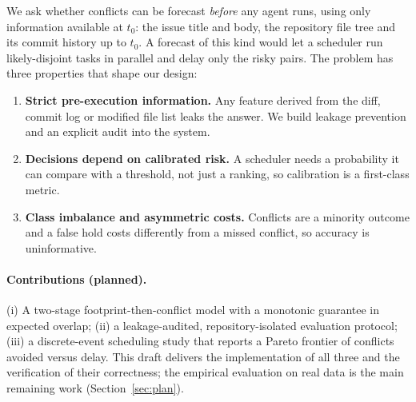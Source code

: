 \documentclass[sigconf, authorversion, nonacm]{acmart}
\begin{document}
We ask whether conflicts can be forecast \emph{before} any agent runs, using only information available at $t_0$: the issue title and body, the repository file tree and its commit history up to $t_0$. A forecast of this kind would let a scheduler run likely-disjoint tasks in parallel and delay only the risky pairs. The problem has three properties that shape our design:
\begin{enumerate}
  \item \textbf{Strict pre-execution information.} Any feature derived from the diff, commit log or modified file list leaks the answer. We build leakage prevention and an explicit audit into the system.
  \item \textbf{Decisions depend on calibrated risk.} A scheduler needs a probability it can compare with a threshold, not just a ranking, so calibration is a first-class metric.
  \item \textbf{Class imbalance and asymmetric costs.} Conflicts are a minority outcome and a false hold costs differently from a missed conflict, so accuracy is uninformative.
\end{enumerate}

\paragraph{Contributions (planned).} (i) A two-stage footprint-then-conflict model with a monotonic guarantee in expected overlap; (ii) a leakage-audited, repository-isolated evaluation protocol; (iii) a discrete-event scheduling study that reports a Pareto frontier of conflicts avoided versus delay. This draft delivers the implementation of all three and the verification of their correctness; the empirical evaluation on real data is the main remaining work (Section~\ref{sec:plan}).
\end{document}
